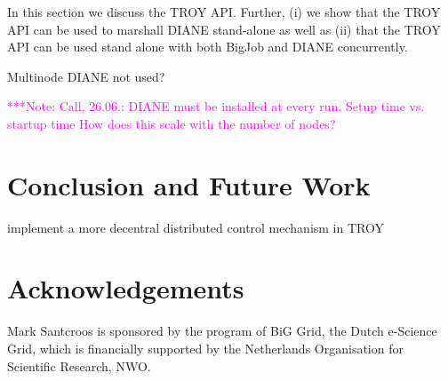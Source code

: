 \documentclass[conference,final]{IEEEtran}
\newcommand{\note}[1]{ {\textcolor{magenta} { ***Note: #1 }}}
\newcommand{\note}[1]{}
\begin{document}
In this section we discuss the TROY API. Further, (i) we show that the TROY API 
can be used to  marshall DIANE stand-alone as well as (ii) that the TROY API 
can be used stand alone with both BigJob and DIANE concurrently.


Multinode DIANE not used?

\note{Call, 26.06.: DIANE must be installed at every run. Setup time vs. startup
time How does this scale with the number of nodes? }

\section{Conclusion and Future Work}


implement a more decentral distributed control mechanism in TROY

\section*{Acknowledgements}
Mark Santcroos is sponsored by the program of BiG Grid, the Dutch e-Science Grid, which is financially supported by the Netherlands Organisation for Scientific Research, NWO.




\end{document}
